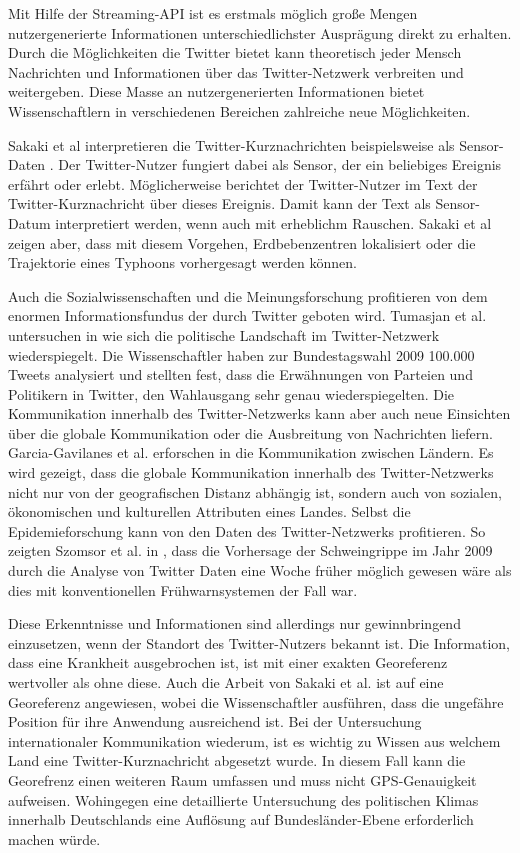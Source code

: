 		Mit Hilfe der Streaming-API ist es erstmals möglich große Mengen nutzergenerierte Informationen unterschiedlichster Ausprägung direkt zu erhalten. 
		Durch die Möglichkeiten die Twitter bietet kann theoretisch jeder Mensch Nachrichten und Informationen über das Twitter-Netzwerk verbreiten und weitergeben. 
		Diese Masse an nutzergenerierten Informationen bietet Wissenschaftlern in verschiedenen Bereichen zahlreiche neue Möglichkeiten.

		Sakaki et al interpretieren die Twitter-Kurznachrichten beispielsweise als Sensor-Daten \cite{Sakaki2010}.
		Der Twitter-Nutzer fungiert dabei als Sensor, der ein beliebiges Ereignis erfährt oder erlebt.
		Möglicherweise berichtet der Twitter-Nutzer im Text der Twitter-Kurznachricht über dieses Ereignis. 
		Damit kann der Text als Sensor-Datum interpretiert werden, wenn auch mit erheblichm Rauschen.    
		Sakaki et al zeigen aber, dass mit diesem Vorgehen, Erdbebenzentren lokalisiert oder die Trajektorie eines Typhoons vorhergesagt werden können.  
		
		Auch die Sozialwissenschaften und die Meinungsforschung profitieren von dem enormen Informationsfundus der durch Twitter geboten wird.  
		Tumasjan et al. untersuchen in \cite{Tumasjan2011} wie sich die politische Landschaft im Twitter-Netzwerk wiederspiegelt. 
		Die Wissenschaftler haben zur Bundestagswahl 2009 100.000 Tweets analysiert und stellten fest, dass die Erwähnungen von Parteien und Politikern in Twitter, den Wahlausgang sehr genau wiederspiegelten.  
		Die Kommunikation innerhalb des Twitter-Netzwerks kann aber auch neue Einsichten über die globale Kommunikation oder die Ausbreitung von Nachrichten liefern.
		Garcia-Gavilanes et al. erforschen in \cite{Garcia-Gavilanes2014} die Kommunikation zwischen Ländern. 
		Es wird gezeigt, dass die globale Kommunikation innerhalb des Twitter-Netzwerks nicht nur von der geografischen Distanz abhängig ist, sondern auch von sozialen, ökonomischen und kulturellen Attributen eines Landes.   
		Selbst die Epidemieforschung kann von den Daten des Twitter-Netzwerks profitieren. 
		So zeigten Szomsor et al. in \cite{Szomszor2011}, dass die Vorhersage der Schweingrippe im Jahr 2009 durch die Analyse von Twitter Daten eine Woche früher möglich gewesen wäre als dies mit konventionellen Frühwarnsystemen der Fall war. 

		Diese Erkenntnisse und Informationen sind allerdings nur gewinnbringend einzusetzen, wenn der Standort des Twitter-Nutzers bekannt ist. 
		Die Information, dass eine Krankheit ausgebrochen ist, ist mit einer exakten Georeferenz wertvoller als ohne diese. 
		Auch die Arbeit von Sakaki et al. ist auf eine Georeferenz angewiesen, wobei die Wissenschaftler ausführen, dass die ungefähre Position für ihre Anwendung ausreichend ist.
		Bei der Untersuchung internationaler Kommunikation wiederum, ist es wichtig zu Wissen aus welchem Land eine Twitter-Kurznachricht abgesetzt wurde.
		In diesem Fall kann die Georefrenz einen weiteren Raum umfassen und muss nicht GPS-Genauigkeit aufweisen.  
		Wohingegen eine detaillierte Untersuchung des politischen Klimas innerhalb Deutschlands eine Auflösung auf Bundesländer-Ebene erforderlich machen würde. 

